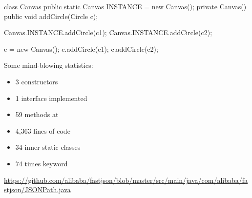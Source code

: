 \documentclass{article}
\begin{document}
\begin{lnSnippet}
class Canvas {
  public static Canvas INSTANCE =
    new Canvas();
  private Canvas() {}
  public void addCircle(Circle c);
}

Canvas.INSTANCE.addCircle(c1);
Canvas.INSTANCE.addCircle(c2);
\end{lnSnippet}
\begin{lnSnippet}
c = new Canvas();
c.addCircle(c1);
c.addCircle(c2);
\end{lnSnippet}


\begin{pptWide}{2}
\par
{}\par
\par\columnbreak\par
Some mind-blowing statistics:
\begin{itemize}
  \item 3 constructors
  \item 1 interface implemented
  \item 59 methods at 
  \item 4,363 lines of code
  \item 34 inner static classes
  \item 74 times  keyword
\end{itemize}
\end{pptWide}
\par
{\tiny \url{https://github.com/alibaba/fastjson/blob/master/src/main/java/com/alibaba/fastjson/JSONPath.java}\par}
\plush{}
\end{document}

